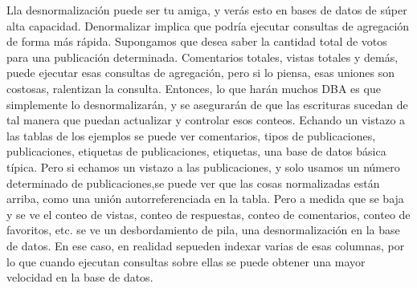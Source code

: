 \documentclass[12pt,conference]{IEEEtran}
\begin{document}
Lla desnormalización puede ser tu amiga, y verás esto en bases de datos de súper alta capacidad. Denormalizar implica que podría ejecutar consultas de agregación de forma más rápida. Supongamos que desea saber la cantidad total de votos para una publicación determinada. Comentarios totales, vistas totales y demás, puede ejecutar esas consultas de agregación, pero si lo piensa, esas uniones son costosas, ralentizan la consulta. Entonces, lo que harán muchos DBA es que simplemente lo desnormalizarán, y se asegurarán de que las escrituras sucedan de tal manera que puedan actualizar y controlar esos conteos.  Echando un vistazo a las tablas de los ejemplos se puede ver comentarios, tipos de publicaciones, publicaciones, etiquetas de publicaciones, etiquetas, una base de datos básica típica. Pero si echamos un vistazo a las publicaciones, y solo usamos un número determinado de publicaciones,se puede ver que las cosas normalizadas están arriba, como una unión autorreferenciada en la tabla. Pero a medida que se baja y se ve el conteo de vistas, conteo de respuestas, conteo de comentarios, conteo de favoritos, etc. se ve un desbordamiento de pila, una desnormalización en la base de datos. En ese caso, en realidad  sepueden indexar varias de esas columnas, por lo que cuando ejecutan consultas sobre ellas se puede obtener una mayor  velocidad en la base de datos.
\end{document}
